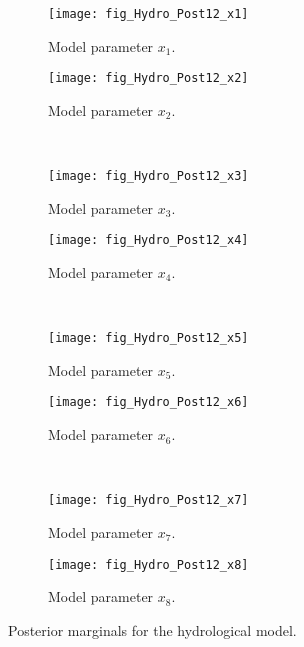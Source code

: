 \begin{figure}[p]
  \centering
  \begin{subfigure}[b]{\HYDROsubWidth}
    \centering
    \texttt{[image: fig\_Hydro\_Post12\_x1]}
    \caption{Model parameter \(x_1\).}
    \label{fig:Hydro:Post:x1}
  \end{subfigure}\hfill%
  \begin{subfigure}[b]{\HYDROsubWidth}
    \centering
    \texttt{[image: fig\_Hydro\_Post12\_x2]}
    \caption{Model parameter \(x_2\).}
    \label{fig:Hydro:Post:x2}
  \end{subfigure}\\[1.4ex]%
  \begin{subfigure}[b]{\HYDROsubWidth}
    \centering
    \texttt{[image: fig\_Hydro\_Post12\_x3]}
    \caption{Model parameter \(x_3\).}
    \label{fig:Hydro:Post:x3}
  \end{subfigure}\hfill%
  \begin{subfigure}[b]{\HYDROsubWidth}
    \centering
    \texttt{[image: fig\_Hydro\_Post12\_x4]}
    \caption{Model parameter \(x_4\).}
    \label{fig:Hydro:Post:x4}
  \end{subfigure}\\[1.4ex]%
  \begin{subfigure}[b]{\HYDROsubWidth}
    \centering
    \texttt{[image: fig\_Hydro\_Post12\_x5]}
    \caption{Model parameter \(x_5\).}
    \label{fig:Hydro:Post:x5}
  \end{subfigure}\hfill%
  \begin{subfigure}[b]{\HYDROsubWidth}
    \centering
    \texttt{[image: fig\_Hydro\_Post12\_x6]}
    \caption{Model parameter \(x_6\).}
    \label{fig:Hydro:Post:x6}
  \end{subfigure}\\[1.4ex]%
  \begin{subfigure}[b]{\HYDROsubWidth}
    \centering
    \texttt{[image: fig\_Hydro\_Post12\_x7]}
    \caption{Model parameter \(x_7\).}
    \label{fig:Hydro:Post:x7}
  \end{subfigure}\hfill%
  \begin{subfigure}[b]{\HYDROsubWidth}
    \centering
    \texttt{[image: fig\_Hydro\_Post12\_x8]}
    \caption{Model parameter \(x_8\).}
    \label{fig:Hydro:Post:x8}
  \end{subfigure}%
  \caption[Posterior marginals for the hydrological model]{Posterior marginals for the hydrological model.}
  \label{fig:Hydro:Post:Parameters}
\end{figure}
